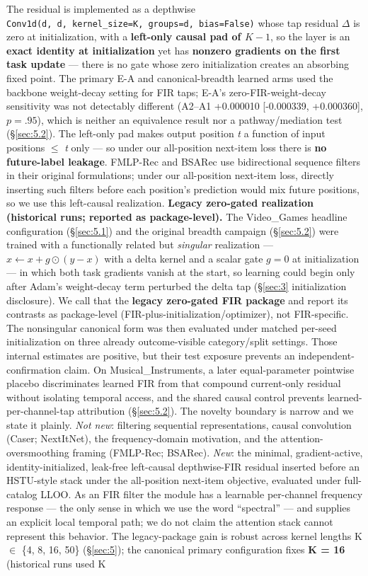 The residual is implemented as a depthwise \texttt{Conv1d(d,\ d,\ kernel\_size=K,\ groups=d,\ bias=False)} whose tap residual $\Delta$ is zero at initialization, with a \textbf{left-only causal pad of $K{-}1$}, so the layer is an \textbf{exact identity at initialization} yet has \textbf{nonzero gradients on the first task update} --- there is no gate whose zero initialization creates an absorbing fixed point. The primary E-A and canonical-breadth learned arms used the backbone weight-decay setting for FIR taps; E-A's zero-FIR-weight-decay sensitivity was not detectably different (A2--A1 +0.000010 [-0.000339, +0.000360], $p=.95$), which is neither an equivalence result nor a pathway/mediation test (\S\ref{sec:5.2}). The left-only pad makes output position \emph{t} a function of input positions \ensuremath{\le} \emph{t} only --- so under our all-position next-item loss there is \textbf{no future-label leakage}. FMLP-Rec \citep{zhou2022fmlprec} and BSARec use bidirectional sequence filters in their original formulations; under our all-position next-item loss, directly inserting such filters before each position's prediction would mix future positions, so we use this left-causal realization. \textbf{Legacy zero-gated realization (historical runs; reported as package-level).} The Video\_Games headline configuration (\S\ref{sec:5.1}) and the original breadth campaign (\S\ref{sec:5.2}) were trained with a functionally related but \emph{singular} realization --- $x \leftarrow x + g \odot (y - x)$ with a delta kernel and a scalar gate $g = 0$ at initialization --- in which both task gradients vanish at the start, so learning could begin only after Adam's weight-decay term perturbed the delta tap (\S\ref{sec:3} initialization disclosure). We call that the \textbf{legacy zero-gated FIR package} and report its contrasts as package-level (FIR-plus-initialization/optimizer), not FIR-specific. The nonsingular canonical form was then evaluated under matched per-seed initialization on three already outcome-visible category/split settings. Those internal estimates are positive, but their test exposure prevents an independent-confirmation claim. On Musical\_Instruments, a later equal-parameter pointwise placebo discriminates learned FIR from that compound current-only residual without isolating temporal access, and the shared causal control prevents learned-per-channel-tap attribution (\S\ref{sec:5.2}). The novelty boundary is narrow and we state it plainly. \emph{Not new}: filtering sequential representations, causal convolution (Caser; NextItNet), the frequency-domain motivation, and the attention-oversmoothing framing (FMLP-Rec; BSARec). \emph{New}: the minimal, gradient-active, identity-initialized, leak-free left-causal depthwise-FIR residual inserted before an HSTU-style stack under the all-position next-item objective, evaluated under full-catalog LLOO. As an FIR filter the module has a learnable per-channel frequency response --- the only sense in which we use the word ``spectral'' --- and supplies an explicit local temporal path; we do not claim the attention stack cannot represent this behavior. The legacy-package gain is robust across kernel lengths K \ensuremath{\in} \{4, 8, 16, 50\} (\S\ref{sec:5}); the canonical primary configuration fixes \textbf{K = 16} (historical runs used K 
